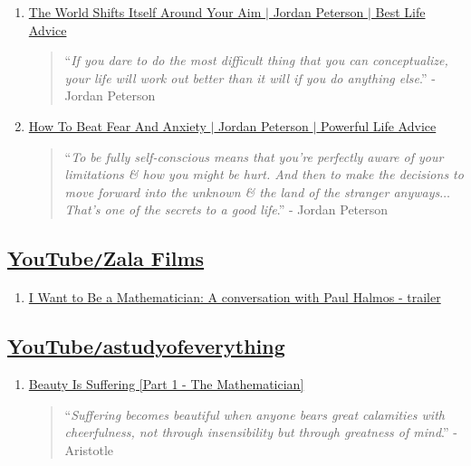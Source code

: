 \documentclass{article}
\begin{document}
\begin{enumerate}
	\item \href{https://www.youtube.com/watch?v=zRYjVFFsi38}{The World Shifts Itself Around Your Aim $|$ Jordan Peterson $|$ Best Life Advice}    
	\begin{quotation}
		``{\it If you dare to do the most difficult thing that you can conceptualize, your life will work out better than it will if you do anything else}.'' - Jordan Peterson
	\end{quotation}
	\item \href{https://www.youtube.com/watch?v=bb9g9mtDHZo}{How To Beat Fear And Anxiety $|$ Jordan Peterson $|$ Powerful Life Advice}    
	\begin{quotation}
		``{\it To be fully self-conscious means that you're perfectly aware of your limitations \& how you might be hurt. And then to make the decisions to move forward into the unknown \& the land of the stranger anyways$\ldots$ That's one of the secrets to a good life}.'' - Jordan Peterson
	\end{quotation}
\end{enumerate}


\subsection{\href{https://www.youtube.com/channel/UCrBsO0_kjefBUQPNgaELGGw}{YouTube{\tt/}Zala Films}}
\begin{enumerate}
	\item \href{https://www.youtube.com/watch?v=ONvYPldXoZs}{I Want to Be a Mathematician: A conversation with Paul Halmos - trailer}
\end{enumerate}


\subsection{\href{https://www.youtube.com/channel/UCDok3oTo2SSWZt6I8sHuzVg}{YouTube{\tt/}astudyofeverything}}
\begin{enumerate}
	\item \href{https://www.youtube.com/watch?v=i0UTeQfnzfM}{Beauty Is Suffering [Part 1 - The Mathematician]}
	\begin{quotation}
		``{\it Suffering becomes beautiful when anyone bears great calamities with cheerfulness, not through insensibility but through greatness of mind}.'' - Aristotle
	\end{quotation}
\end{enumerate}
\end{document}
